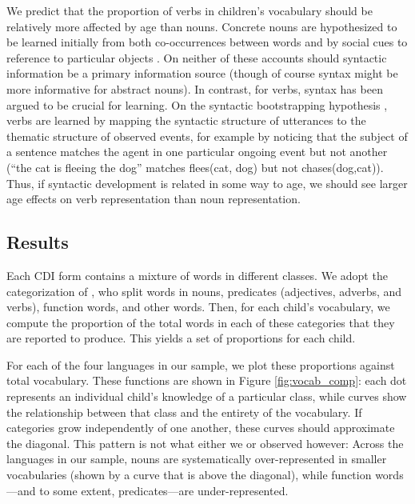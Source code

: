 \documentclass[10pt,letterpaper]{article}
\begin{document}
We predict that the proportion of verbs in children's vocabulary should be relatively more affected by age than nouns. Concrete nouns are hypothesized to be learned initially from both co-occurrences between words \cite{yu2007b} and by social cues to reference to particular objects \cite{bloom2002}. On neither of these accounts should syntactic information be a primary information source (though of course syntax might be more informative for abstract nouns). In contrast, for verbs, syntax has been argued to be crucial for learning. On the syntactic bootstrapping hypothesis \cite{gleitman1990,fisher2010}, verbs are learned by mapping the syntactic structure of utterances to the thematic structure of observed events, for example by noticing that the subject of a sentence matches the agent in one particular ongoing event but not another (``the cat is fleeing the dog'' matches {\sc flees(cat, dog)} but not {\sc chases(dog,cat)}). Thus, if syntactic development is related in some way to age, we should see larger age effects on verb representation than noun representation. 

\subsection{Results}

Each CDI form contains a mixture of words in different classes. We adopt the categorization of , who split words in nouns, predicates (adjectives, adverbs, and verbs), function words, and other words. Then, for each child's vocabulary, we compute the proportion of the total words in each of these categories that they are reported to produce. This yields a set of proportions for each child.

For each of the four languages in our sample, we plot these proportions against total vocabulary. These functions are shown in Figure \ref{fig:vocab_comp}: each dot represents an individual child's knowledge of a particular class, while curves show the relationship between that class and the entirety of the vocabulary. If categories grow independently of one another, these curves should approximate the diagonal. This pattern is not what either we or \citeauthor{bates1994} observed however: Across the languages in our sample, nouns are systematically over-represented in smaller vocabularies (shown by a curve that is above the diagonal), while function words---and to some extent, predicates---are under-represented. 
\end{document}
